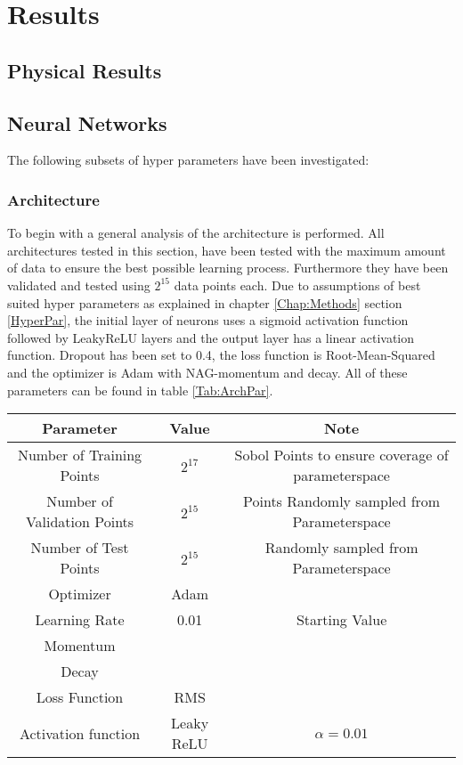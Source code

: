 \chapter{Results}
	\label{Chap:Results}
	\section{Physical Results}
	\section{Neural Networks}
		The following subsets of hyper parameters have been investigated:
		\subsection{Architecture}
			To begin with a general analysis of the architecture is performed. All architectures tested in this section, have been tested with the maximum amount of data to ensure the best possible learning process. Furthermore they have been validated and tested using $2^{15}$ data points each. Due to assumptions of best suited hyper parameters as explained in chapter \ref{Chap:Methods} section \ref{HyperPar}, the initial layer of neurons uses a sigmoid activation function followed by LeakyReLU layers and the output layer has a linear activation function. Dropout has been set to 0.4, the loss function is Root-Mean-Squared and the optimizer is Adam with NAG-momentum and decay. All of these parameters can be found in table \ref{Tab:ArchPar}.\\
			
			\begin{tabular}{c|c|c}
				Parameter & Value & Note\\
				\hline
				Number of Training Points & $2^{17}$ & Sobol Points to ensure coverage of parameterspace\\
				Number of Validation Points & $2^{15}$ & Points Randomly sampled from Parameterspace \\
				Number of Test Points & $2^{15}$ & Randomly sampled from Parameterspace\\
				Optimizer & Adam & \\
				Learning Rate & 0.01 & Starting Value \\
				Momentum & & \\
				Decay & & \\
				Loss Function & RMS & \\
				Activation function & Leaky ReLU & $\alpha = 0.01$\\
			\end{tabular}
		

